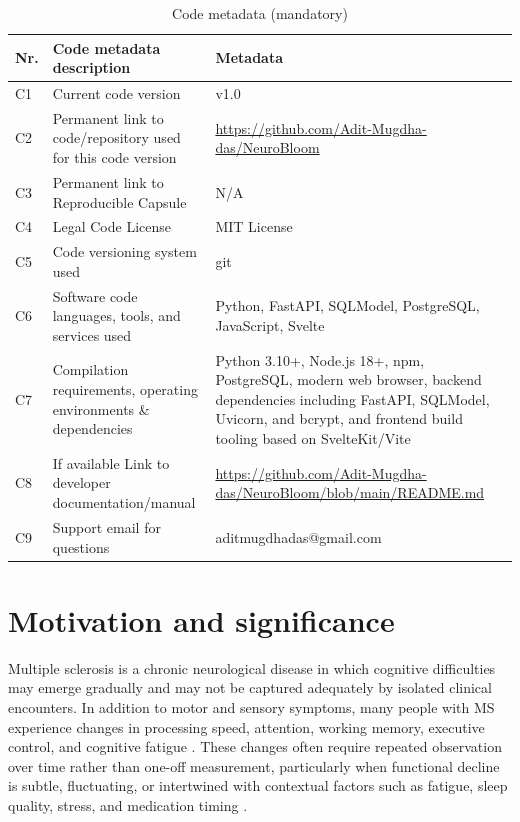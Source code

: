 \documentclass[preprint,12pt,a4paper]{elsarticle}
\begin{document}
\begin{table}[!h]
\begin{tabular}{|l|p{6.5cm}|p{6.5cm}|}
\hline
\textbf{Nr.} & \textbf{Code metadata description} & \textbf{Metadata} \\
\hline
C1 & Current code version & v1.0 \\
\hline
C2 & Permanent link to code/repository used for this code version & \url{https://github.com/Adit-Mugdha-das/NeuroBloom} \\
\hline
C3 & Permanent link to Reproducible Capsule & N/A \\
\hline
C4 & Legal Code License & MIT License \\
\hline
C5 & Code versioning system used & git \\
\hline
C6 & Software code languages, tools, and services used & Python, FastAPI, SQLModel, PostgreSQL, JavaScript, Svelte \\
\hline
C7 & Compilation requirements, operating environments \& dependencies & Python 3.10+, Node.js 18+, npm, PostgreSQL, modern web browser, backend dependencies including FastAPI, SQLModel, Uvicorn, and bcrypt, and frontend build tooling based on SvelteKit/Vite \\
\hline
C8 & If available Link to developer documentation/manual & \url{https://github.com/Adit-Mugdha-das/NeuroBloom/blob/main/README.md} \\
\hline
C9 & Support email for questions & aditmugdhadas@gmail.com \\
\hline
\end{tabular}
\caption{Code metadata (mandatory)}
\label{codeMetadata}
\end{table}
\section{Motivation and significance}
Multiple sclerosis is a chronic neurological disease in which cognitive difficulties may emerge gradually and may not be captured adequately by isolated clinical encounters. In addition to motor and sensory symptoms, many people with MS experience changes in processing speed, attention, working memory, executive control, and cognitive fatigue \cite{chiaravalloti2008,amato2006,rocca2015}. These changes often require repeated observation over time rather than one-off measurement, particularly when functional decline is subtle, fluctuating, or intertwined with contextual factors such as fatigue, sleep quality, stress, and medication timing \cite{amato2006,kalb2018}.
\end{document}
